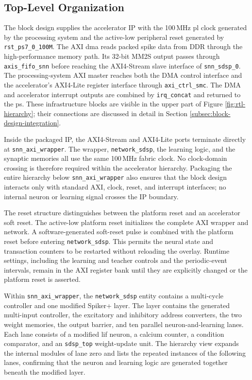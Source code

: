 \subsection{Top-Level Organization}

The block design supplies the accelerator IP with the 100\,MHz \gls{pl} clock generated by the processing system and the active-low peripheral reset generated by \texttt{rst\_ps7\_0\_100M}. The AXI \gls{dma} reads packed spike data from DDR through the high-performance memory path. Its 32-bit MM2S output passes through \texttt{axis\_fifo\_snn} before reaching the AXI4-Stream slave interface of \texttt{snn\_sdsp\_0}. The processing-system AXI master reaches both the DMA control interface and the accelerator's AXI4-Lite register interface through \texttt{axi\_ctrl\_smc}. The DMA and accelerator interrupt outputs are combined by \texttt{irq\_concat} and returned to the \gls{ps}. These infrastructure blocks are visible in the upper part of Figure \ref{fig:rtl-hierarchy}; their connections are discussed in detail in Section \ref{subsec:block-design-integration}.

Inside the packaged IP, the AXI4-Stream and AXI4-Lite ports terminate directly at \texttt{snn\_axi\_wrapper}. The wrapper, \texttt{network\_sdsp}, the learning logic, and the synaptic memories all use the same 100\,MHz fabric clock. No clock-domain crossing is therefore required within the accelerator hierarchy. Packaging the entire hierarchy below \texttt{snn\_axi\_wrapper} also ensures that the block design interacts only with standard AXI, clock, reset, and interrupt interfaces; no internal neuron or learning signal crosses the IP boundary.

The reset structure distinguishes between the platform reset and an accelerator soft reset. The active-low platform reset initializes the complete AXI wrapper and network. A software-generated soft-reset pulse is combined with the platform reset before entering \texttt{network\_sdsp}. This permits the neural state and transaction counters to be restarted without reloading the overlay. Runtime settings, including the learning and teacher controls and the periodic-event intervals, remain in the AXI register bank until they are explicitly changed or the platform reset is asserted.

Within \texttt{snn\_axi\_wrapper}, the \texttt{network\_sdsp} entity contains a multi-cycle controller and one modified Spiker+ layer. The layer contains the generated multi-input controller, the excitatory and inhibitory address converters, the two weight memories, the output barrier, and ten parallel neuron-and-learning lanes. Each lane consists of a modified \gls{lif} neuron, a calcium counter, a condition comparator, and an \texttt{sdsp\_top} weight-update unit. The hierarchy view expands the internal modules of lane zero and lists the repeated instances of the following lanes, confirming that the neuron and learning logic are generated together beneath the modified layer.

